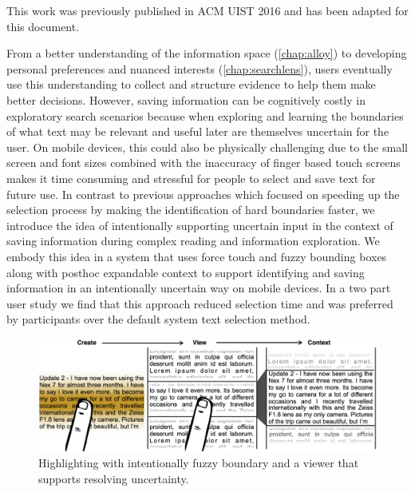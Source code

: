 

{\ttfamily
This work was previously published in ACM UIST 2016 \cite{Chang:2016:SMS:2984511.2984538} and has been adapted for this document.
}

From a better understanding of the information space (\cref{chap:alloy}) to developing personal preferences and nuanced interests (\cref{chap:searchlens}), users eventually use this understanding to collect and structure evidence to help them make better decisions. However, saving information can be cognitively costly in exploratory search scenarios because when exploring and learning the boundaries of what text may be relevant and useful later are themselves uncertain for the user. On mobile devices, this could also be physically challenging due to the small screen and font sizes combined with the inaccuracy of finger based touch screens makes it time consuming and stressful for people to select and save text for future use. In contrast to previous approaches which focused on speeding up the selection process by making the identification of hard boundaries faster, we introduce the idea of intentionally supporting uncertain input in the context of saving information during complex reading and information exploration. We embody this idea in a system that uses force touch and fuzzy bounding boxes along with posthoc expandable context to support identifying and saving information in an intentionally uncertain way on mobile devices. In a two part user study we find that this approach reduced selection time and was preferred by participants over the default system text selection method.


\begin{figure}
    \centering
    \includegraphics[width=0.8\columnwidth]{Chapters/Highlight/img/system.png}
    \caption[Fuzzy highlighting interaction and corresponding viewer]{Highlighting with intentionally fuzzy boundary and a viewer that supports resolving uncertainty.}
    \label{fig:fuzzy}
\end{figure}


